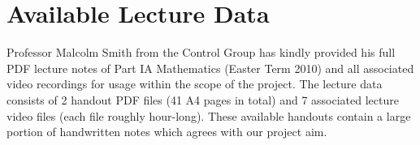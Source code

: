 \section{Available Lecture Data}

Professor Malcolm Smith from the Control Group has kindly provided his full PDF lecture notes of Part IA Mathematics (Easter Term 2010) and all associated video recordings for usage within the scope of the project. The lecture data consists of 2 handout PDF files (41 A4 pages in total) and 7 associated lecture video files (each file roughly hour-long). These available handouts contain a large portion of handwritten notes which agrees with our project aim.

